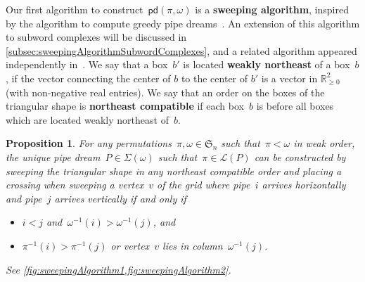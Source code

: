 \documentclass[reqno]{amsart}
\newtheorem{proposition}[theorem]{Proposition}
\theoremstyle{definition}
\newcommand{\defn}[1]{\textbf{\textsf{\color{PineGreen} #1}}} %
\newcommand{\fS}{\mathfrak{S}} %
\newcommand{\acyclicPipeDreams}{\Sigma} %
\newcommand{\linearExtensions}{\mathcal{L}} %
\newcommand{\insertion}[2]{\mathsf{pd}(#1,#2)} %
\begin{document}
Our first algorithm to construct~$\insertion{\pi}{\omega}$ is a \defn{sweeping algorithm}, inspired by the algorithm to compute greedy pipe dreams~\cite{PilaudPocchiola, PilaudStump-ELlabelings}.
An extension of this algorithm to subword complexes will be discussed in \cref{subsec:sweepingAlgorithmSubwordComplexes}, and a related algorithm appeared independently in~\cite{JahnStump}.
We say that a box~$b'$ is located \defn{weakly northeast} of a box~$b$, if the vector connecting the center of $b$ to the center of $b'$ is a vector in $\mathbb{R}^2_{\geq 0}$ (with non-negative real entries). 
We say that an order on the boxes of the triangular shape is \defn{northeast compatible} if each box~$b$ is before all boxes which are located weakly northeast of~$b$.

\begin{proposition}
\label{prop:sweepingAlgorithm}
For any permutations~$\pi,\omega \in \fS_n$ such that~$\pi < \omega$ in weak order, the unique pipe dream~$P \in \acyclicPipeDreams(\omega)$ such that~$\pi \in \linearExtensions(P)$ can be constructed by sweeping the triangular shape in any northeast compatible order and placing a crossing when sweeping a vertex~$v$ of the grid where pipe~$i$ arrives horizontally and pipe~$j$ arrives vertically if and only if
\begin{itemize}
\item $i < j$ and~$\omega^{-1}(i) > \omega^{-1}(j)$, and 
\item $\pi^{-1}(i) > \pi^{-1}(j)$ or vertex~$v$ lies in column~$\omega^{-1}(j)$.
\end{itemize}
See \cref{fig:sweepingAlgorithm1,fig:sweepingAlgorithm2}.
\end{proposition}
\end{document}
